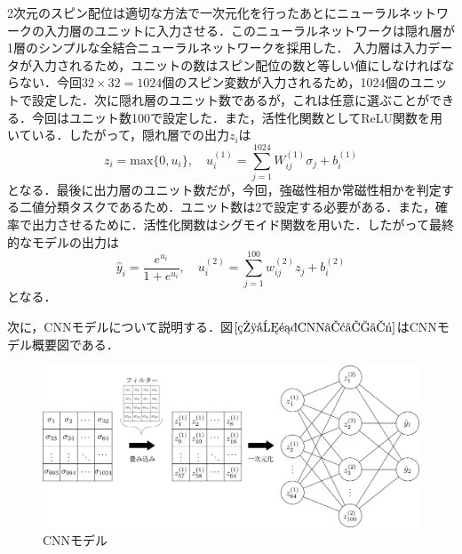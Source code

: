 \documentclass[a4paper,11pt]{jsreport}
\begin{document}
2次元のスピン配位は適切な方法で一次元化を行ったあとにニューラルネットワークの入力層のユニットに入力させる．このニューラルネットワークは隠れ層が1層のシンプルな全結合ニューラルネットワークを採用した．
入力層は入力データが入力されるため，ユニットの数はスピン配位の数と等しい値にしなければならない．今回$32 \times 32 = 1024$個のスピン変数が入力されるため，1024個のユニットで設定した．次に隠れ層のユニット数であるが，これは任意に選ぶことができる．今回はユニット数100で設定した．また，活性化関数としてReLU関数を用いている．したがって，隠れ層での出力$z_i$は
\begin{equation}
  z_i 
  = \mathrm{max}\{0,u_i\}, \quad
  u_i^{(1)} = \sum_{j=1}^{1024} W_{ij}^{(1)} \sigma_j + b_i^{(1)}
\end{equation}
となる．最後に出力層のユニット数だが，今回，強磁性相か常磁性相かを判定する二値分類タスクであるため．ユニット数は2で設定する必要がある．また，確率で出力させるために．活性化関数はシグモイド関数を用いた．したがって最終的なモデルの出力は
\begin{equation}
  \hat{y}_i 
  = \frac{e^{u_i}}{1 + e^{u_i}}, \quad
  u_i^{(2)} = \sum_{j=1}^{100} w_{ij}^{(2)} z_j + b_i^{(2)}
\end{equation}
となる．

次に，CNNモデルについて説明する．図$\ref{相分類CNNモデル}$はCNNモデル概要図である．

\begin{figure}[H]
   \begin{center}
       \includegraphics[width=\linewidth]{image/相分類CNNモデル.png}
       \caption{CNNモデル}
       \label{相分類CNNモデル}
   \end{center}
\end{figure}
\end{document}
